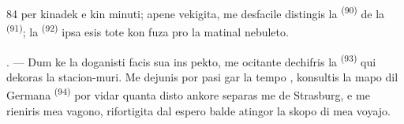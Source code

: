 \begin{VUpage}[86]{84}
\VUcontinue
per kinadek e kin minuti; apene vekigita, me\nl
desfacile distingis la  \textsuperscript{(90)} de la \cc
{} \textsuperscript{(91)}; la  \textsuperscript{(92)} ipsa esis tote kon\cc
fuza pro la matinal nebuleto.

. --- Dum ke la doganisti facis sua ins\cc
pekto, me ocitante dechifris la  \textsuperscript{(93)} qui\nl
dekoras la stacion-muri. Me dejunis por pasi\cc
gar la tempo , konsultis la mapo dil Germana\nl
{} \textsuperscript{(94)} por vidar quanta disto ankore separas\nl
me de Strasburg, e me rieniris mea vagono,\nl
rifortigita dal espero balde atingor la skopo di\nl
mea voyajo.

\VUsaut{6.0mm}
\VUfilet{22mm}
\end{VUpage}
